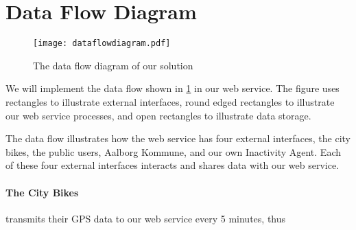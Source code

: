 \section{Data Flow Diagram}
 \begin{figure}[H]
\texttt{[image: dataflowdiagram.pdf]}
\caption{The data flow diagram of our solution}
\label{fig:dataFlowDiagram}
\end{figure}
\pagebreak

We will implement the data flow shown in \cref{fig:dataFlowDiagram} in our web service. The figure uses rectangles to illustrate external interfaces, round edged rectangles to illustrate our web service processes, and open rectangles to illustrate data storage.

The data flow illustrates how the web service has four external interfaces, the city bikes, the public users, Aalborg Kommune, and our own Inactivity Agent.
Each of these four external interfaces interacts and shares data with our web service.

\paragraph{The City Bikes} transmits their GPS data to our web service every 5 minutes, thus 

